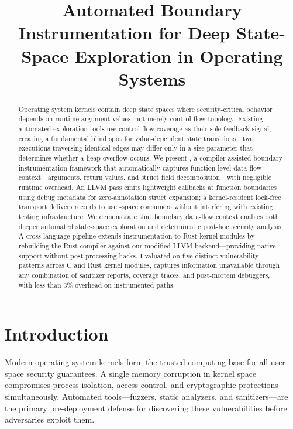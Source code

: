 \documentclass{ndss}
\title{Automated Boundary Instrumentation for Deep State-Space Exploration in Operating Systems}
\date{}
\begin{document}
\maketitle

\begin{abstract}
Operating system kernels contain deep state spaces where security-critical
behavior depends on runtime argument values, not merely control-flow topology.
Existing automated exploration tools use control-flow coverage as their sole
feedback signal, creating a fundamental blind spot for value-dependent state
transitions---two executions traversing identical edges may differ only in a
size parameter that determines whether a heap overflow occurs. We present
\toolname{}, a compiler-assisted boundary instrumentation framework that
automatically captures function-level data-flow context---arguments, return
values, and struct field decomposition---with negligible runtime overhead. An
LLVM pass emits lightweight callbacks at function boundaries using debug
metadata for zero-annotation struct expansion; a kernel-resident lock-free
transport delivers records to user-space consumers without interfering with
existing testing infrastructure. We demonstrate that boundary data-flow context
enables both deeper automated state-space exploration and deterministic post-hoc
security analysis. A cross-language pipeline extends instrumentation to Rust
kernel modules by rebuilding the Rust compiler against our modified LLVM
backend---providing native support without post-processing hacks. Evaluated on
five distinct vulnerability patterns across C and Rust kernel modules,
\toolname{} captures information unavailable through any combination of
sanitizer reports, coverage traces, and post-mortem debuggers, with less than
3\% overhead on instrumented paths.
\end{abstract}

\section{Introduction}\label{sec:intro}

Modern operating system kernels form the trusted computing base for all
user-space security guarantees. A single memory corruption in kernel space
compromises process isolation, access control, and cryptographic protections
simultaneously. Automated tools---fuzzers, static analyzers, and
sanitizers---are the primary pre-deployment defense for discovering these
vulnerabilities before adversaries exploit them.
\end{document}
